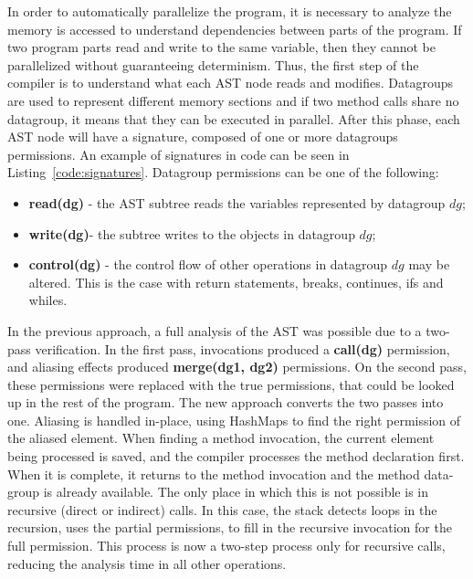 \documentclass[smallextended]{svjour3}
\begin{document}
In order to automatically parallelize the program, it is necessary to analyze the memory is accessed to understand dependencies between parts of the program. If two program parts read and write to the same variable, then they cannot be parallelized without guaranteeing determinism. Thus, the first step of the compiler is to understand what each AST node reads and modifies. Datagroups\cite{leino2002using} are used to represent different memory sections and if two method calls share no datagroup, it means that they can be executed in parallel. After this phase, each AST node will have a signature, composed of one or more datagroups permissions. An example of signatures in code can be seen in Listing~\ref{code:signatures}. Datagroup permissions can be one of the following: 

\begin{itemize}
	\item \textbf{read(dg)} - the AST subtree reads the variables represented by datagroup $dg$;
	\item \textbf{write(dg)}- the subtree writes to the objects in datagroup $dg$;
	\item \textbf{control(dg)} - the control flow of other operations in datagroup $dg$ may be altered. This is the case with return statements, breaks, continues, ifs and whiles.
\end{itemize}

In the previous approach, a full analysis of the AST was possible due to a two-pass verification. In the first pass, invocations produced a \textbf{call(dg)} permission, and aliasing effects produced \textbf{merge(dg1, dg2)} permissions. On the second pass, these permissions were replaced with the true permissions, that could be looked up in the rest of the program. The new approach converts the two passes into one. Aliasing is handled in-place, using HashMaps to find the right permission of the aliased element. When finding a method invocation, the current element being processed is saved, and the compiler processes the method declaration first. When it is complete, it returns to the method invocation and the method data-group is already available. The only place in which this is not possible is in recursive (direct or indirect) calls. In this case, the stack detects loops in the recursion, uses the partial permissions, to fill in the recursive invocation for the full permission. This process is now a two-step process only for recursive calls, reducing the analysis time in all other operations.
\end{document}
